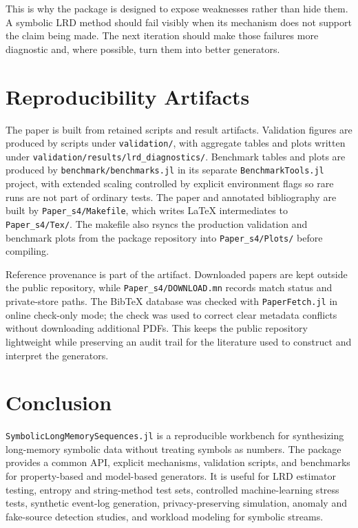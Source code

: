 \documentclass[journal]{IEEEtran}
\newcommand{\code}[1]{\texttt{#1}}
\newcommand{\pkg}[1]{\texttt{#1}}
\newcommand{\sfive}{\pkg{SymbolicLongMemorySequences.jl}}
\begin{document}
This is why the package is designed to expose weaknesses rather than hide them.
A symbolic LRD method should fail visibly when its mechanism does not support the
claim being made.  The next iteration should make those failures more diagnostic
and, where possible, turn them into better generators.

\section{Reproducibility Artifacts}

The paper is built from retained scripts and result artifacts.  Validation
figures are produced by scripts under \code{validation/}, with aggregate tables and plots
written under \code{validation/results/lrd\_diagnostics/}.  Benchmark tables and
plots are produced by \code{benchmark/benchmarks.jl} in its separate
\pkg{BenchmarkTools.jl} project, with extended scaling controlled by explicit
environment flags so rare runs are not part of ordinary tests.  The paper and
annotated bibliography are built by \code{Paper\_s4/Makefile}, which writes
LaTeX intermediates to \code{Paper\_s4/Tex/}.  The makefile also rsyncs the
production validation and benchmark plots from the package repository into
\code{Paper\_s4/Plots/} before compiling.

Reference provenance is part of the artifact.  Downloaded papers are kept
outside the public repository, while \code{Paper\_s4/DOWNLOAD.mn} records match
status and private-store paths.  The BibTeX database was checked with
\pkg{PaperFetch.jl} in online check-only mode; the check was used to correct
clear metadata conflicts without downloading additional PDFs.  This keeps the
public repository lightweight while preserving an audit trail for the literature
used to construct and interpret the generators.

\section{Conclusion}

\sfive{} is a reproducible workbench for synthesizing long-memory symbolic
data without treating symbols as numbers.  The package provides a common API,
explicit mechanisms, validation scripts, and benchmarks for property-based and
model-based generators.  It is useful for LRD
estimator testing, entropy and string-method test sets, controlled
machine-learning stress tests, synthetic event-log generation,
privacy-preserving simulation, anomaly and fake-source detection studies, and
workload modeling for symbolic streams.
\end{document}
